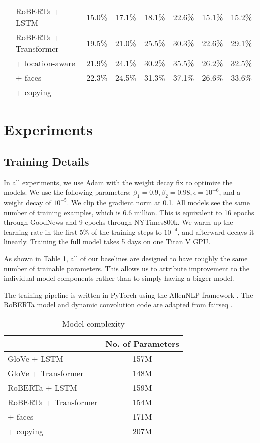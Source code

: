 \begin{table*}[t]
\begin{tabularx}{\textwidth}{llXXXXXX}
      & RoBERTa + LSTM & 15.0\% & 17.1\% & 18.1\% & 22.6\% & 15.1\% & 15.2\% \\
      & RoBERTa + Transformer & 19.5\% & 21.0\% & 25.5\% & 30.3\% & 22.6\% & 29.1\% \\
      & \quad + location-aware & 21.9\% & 24.1\% & 30.2\% & 35.5\% & 26.2\% & 32.5\% \\
      & \quad\quad + faces & 22.3\% & 24.5\% & 31.3\% & 37.1\% & 26.6\% & 33.6\% \\
      & \quad\quad\quad + copying \\
		\bottomrule
	\end{tabularx}
\end{table*}

\section{Experiments}

\subsection{Training Details}

In all experiments, we use Adam \cite{Kingma2015Adam} with the weight decay fix
\cite{Loshchilov2018DecoupledWD} to optimize the models. We use the following
parameters: $\beta_1 = 0.9, \beta_2 = 0.98, \epsilon = 10^{-6}$, and a weight
decay of $10^{-5}$. We clip the gradient norm at 0.1. All models see the same
number of training examples, which is 6.6 million. This is equivalent to 16
epochs through GoodNews and 9 epochs through NYTimes800k. We warm up the
learning rate in the first 5\% of the training steps to $10^{-4}$, and
afterward decays it linearly. Training the full model takes 5 days on one Titan
V GPU.

As shown in Table \ref{tab:models}, all of our baselines are designed to have
roughly the same number of trainable parameters. This allows us to attribute
improvement to the individual model components rather than to simply having a
bigger model.

The training pipeline is written in PyTorch \cite{Paszke2017Automatic} using
the AllenNLP framework \cite{Gardner2017AllenNLP}. The RoBERTa model and
dynamic convolution code are adapted from fairseq \cite{Ott2019Fairseq}.

\begin{table}[t]
	\caption {Model complexity}
	\label{tab:models}
	\centering
	\begin{tabularx}{\linewidth}{Xc}
		\toprule
        & No. of Parameters \\
      \midrule
      GloVe + LSTM & 157M \\
      GloVe + Transformer & 148M \\
      RoBERTa + LSTM & 159M \\
      RoBERTa + Transformer & 154M \\
      \quad + faces & 171M \\
      \quad\quad + copying & 207M \\
		\bottomrule
	\end{tabularx}
\end{table}

